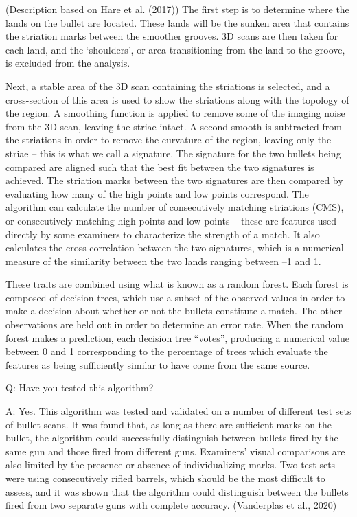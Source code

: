 \documentclass[print]{nuthesis}
\begin{document}
(Description based on Hare et al. (2017))
The first step is to determine where the lands on the bullet are located.
These lands will be the sunken area that contains the striation marks between the smoother grooves.
3D scans are then taken for each land, and the `shoulders', or area transitioning from the land to the groove, is excluded from the analysis.

Next, a stable area of the 3D scan containing the striations is selected, and a cross-section of this area is used to show the striations along with the topology of the region.
A smoothing function is applied to remove some of the imaging noise from the 3D scan, leaving the striae intact.
A second smooth is subtracted from the striations in order to remove the curvature of the region, leaving only the striae -- this is what we call a signature.
The signature for the two bullets being compared are aligned such that the best fit between the two signatures is achieved.
The striation marks between the two signatures are then compared by evaluating how many of the high points and low points correspond.
The algorithm can calculate the number of consecutively matching striations (CMS), or consecutively matching high points and low points -- these are features used directly by some examiners to characterize the strength of a match.
It also calculates the cross correlation between the two signatures, which is a numerical measure of the similarity between the two lands ranging between --1 and 1.

These traits are combined using what is known as a random forest.
Each forest is composed of decision trees, which use a subset of the observed values in order to make a decision about whether or not the bullets constitute a match.
The other observations are held out in order to determine an error rate.
When the random forest makes a prediction, each decision tree ``votes'', producing a numerical value between 0 and 1 corresponding to the percentage of trees which evaluate the features as being sufficiently similar to have come from the same source.

Q: Have you tested this algorithm?

A: Yes.
This algorithm was tested and validated on a number of different test sets of bullet scans.
It was found that, as long as there are sufficient marks on the bullet, the algorithm could successfully distinguish between bullets fired by the same gun and those fired from different guns.
Examiners' visual comparisons are also limited by the presence or absence of individualizing marks.
Two test sets were using consecutively rifled barrels, which should be the most difficult to assess, and it was shown that the algorithm could distinguish between the bullets fired from two separate guns with complete accuracy. (Vanderplas et al., 2020)
\end{document}
